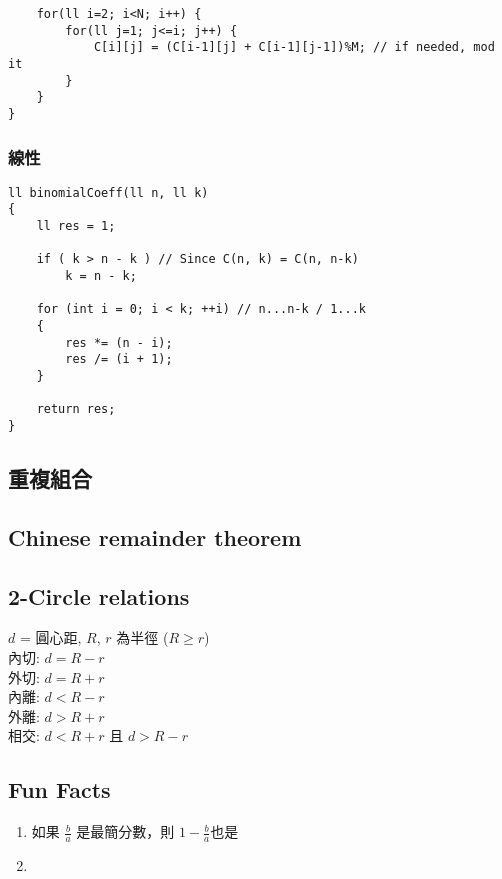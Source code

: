 \documentclass[10pt,oneside]{article}
\begin{document}
\begin{landscape}
\begin{multicols}{2}
\begin{lstlisting}
    for(ll i=2; i<N; i++) {
        for(ll j=1; j<=i; j++) {
            C[i][j] = (C[i-1][j] + C[i-1][j-1])%M; // if needed, mod it
        }
    }
}
\end{lstlisting}

\subsubsection{線性}

\begin{lstlisting}
ll binomialCoeff(ll n, ll k)
{
    ll res = 1;
 
    if ( k > n - k ) // Since C(n, k) = C(n, n-k)
        k = n - k;
 
    for (int i = 0; i < k; ++i) // n...n-k / 1...k
    {
        res *= (n - i);
        res /= (i + 1);
    }
 
    return res;
}
\end{lstlisting}

\subsection{重複組合}

\subsection{Chinese remainder theorem}


\subsection{2-Circle relations}

$d$ = 圓心距, $R$, $r$ 為半徑 ($R \geq r$)\\
內切: $d = R - r$\\
外切: $d = R + r$\\
內離: $d < R - r$\\
外離: $d > R + r$\\
相交: $d < R + r$ 且 $d > R - r$

\subsection{Fun Facts}

\begin{enumerate}
	\item 如果 $\frac b a$ 是最簡分數，則 $1 - \frac b a$也是%
	\item 
\end{enumerate}


\end{multicols}
\end{landscape}
\end{document}
